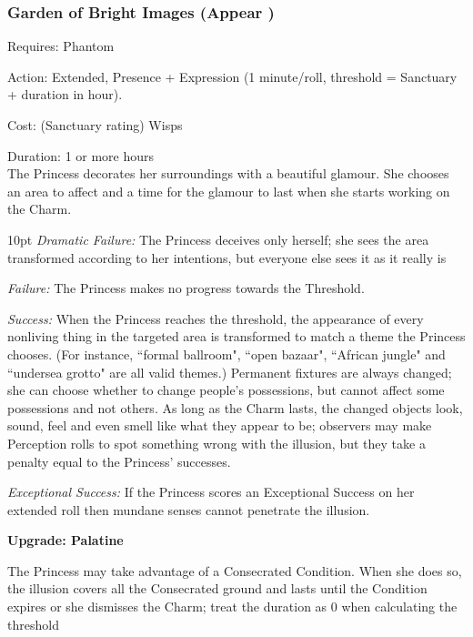 \subsubsection*{Garden of Bright Images (Appear \textbullet\textbullet\textbullet\textbullet)}
\noindent Requires: Phantom

\noindent Action: Extended, Presence + Expression (1 minute/roll, threshold = Sanctuary + duration in hour). 

\noindent Cost: (Sanctuary rating) Wisps

\noindent Duration: 1 or more hours \\

\noindent The Princess decorates her surroundings with a beautiful glamour. She chooses an area to affect and a time for the glamour to last when she starts working on the Charm.

\begin{myindentpar}{10pt}    \emph{Dramatic Failure:} The Princess deceives only herself; she sees the area transformed according to her intentions, but everyone else sees it as it really is

\emph{Failure:} The Princess makes no progress towards the Threshold.

\emph{Success:} When the Princess reaches the threshold, the appearance of every nonliving thing in the targeted area is transformed to match a theme the Princess chooses. (For instance, \textquotedblleft formal ballroom", \textquotedblleft open bazaar", \textquotedblleft African jungle" and \textquotedblleft undersea grotto" are all valid themes.) Permanent fixtures are always changed; she can choose whether to change people’s possessions, but cannot affect some possessions and not others. As long as the Charm lasts, the changed objects look, sound, feel and even smell like what they appear to be; observers may make Perception rolls to spot something wrong with the illusion, but they take a penalty equal to the Princess’ successes.

\emph{Exceptional Success:} If the Princess scores an Exceptional Success on her extended roll then mundane senses cannot penetrate the illusion. 

\textbf{Upgrade: Palatine} 

The Princess may take advantage of a Consecrated Condition. When she does so, the illusion covers all the Consecrated ground and lasts until the Condition expires or she dismisses the Charm; treat the duration as 0 when calculating the threshold\end{myindentpar}

